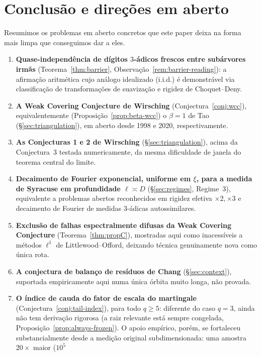 \documentclass[11pt]{article}
\theoremstyle{definition}
\theoremstyle{remark}
\begin{document}
\section{Conclusão e direções em aberto}
\label{sec:conclusion}

Resumimos os problemas em aberto concretos que este paper deixa na
forma mais limpa que conseguimos dar a eles.

\begin{enumerate}[label=(A\arabic*)]
\item \textbf{Quase-independência de dígitos $3$-ádicos frescos entre
  subárvores irmãs} (Teorema~\ref{thm:barrier},
  Observação~\ref{rem:barrier-reading}): a afirmação
  aritmética cujo análogo idealizado (i.i.d.) é demonstrável via
  classificação de transformações de suavização e rigidez de
  Choquet--Deny.
\item \textbf{A Weak Covering Conjecture de Wirsching}
  (Conjectura~\ref{conj:wcc}), equivalentemente
  (Proposição~\ref{prop:beta-wcc}) o $\beta=1$ de Tao
  (\S\ref{sec:triangulation}), em aberto desde 1998 e 2020,
  respectivamente.
\item \textbf{As Conjecturas 1 e 2 de Wirsching} (\S\ref{sec:triangulation}),
  acima da Conjectura~3 testada numericamente, da mesma dificuldade de
  janela do teorema central do limite.
\item \textbf{Decaimento de Fourier exponencial, uniforme em $\xi$,
  para a medida de Syracuse em profundidade $\ell\asymp D$}
  (\S\ref{sec:regimes}, Regime~3), equivalente a problemas abertos
  reconhecidos em rigidez efetiva $\times2,\times3$ e decaimento de
  Fourier de medidas $3$-ádicas autossimilares.
\item \textbf{Exclusão de falhas espectralmente difusas da Weak
  Covering Conjecture} (Teorema~\ref{thm:propC}), mostradas aqui como
  inacessíveis a métodos $\ell^1$ de Littlewood--Offord, deixando
  técnica genuinamente nova como única rota.
\item \textbf{A conjectura de balanço de resíduos de Chang}
  \cite{Chang2026} (\S\ref{sec:context}), suportada empiricamente aqui
  numa única órbita muito longa, não provada.
\item \textbf{O índice de cauda do fator de escala do martingale}
  (Conjectura~\ref{conj:tail-index}), para todo $q\ge5$: diferente do
  caso $q=3$, ainda não tem derivação rigorosa (a raiz relevante está
  sempre congelada, Proposição~\ref{prop:always-frozen}). O apoio
  empírico, porém, se fortaleceu substancialmente desde a medição
  original subdimensionada: uma amostra $20\times$ maior ($10^5$

\end{enumerate}
\end{document}
